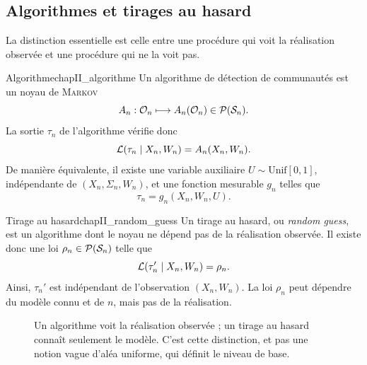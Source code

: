 \subsection{Algorithmes et tirages au hasard}

La distinction essentielle est celle entre une procédure qui voit la réalisation observée et une procédure qui ne la voit pas.

\begin{Definition}{Algorithme}{chapII_algorithme}
Un algorithme de détection de communautés est un noyau de \textsc{Markov}
\[
    A_n:\mathcal O_n\longmapsto A_n(\mathcal O_n)\in\mathcal P(\mathcal S_n).
\]
La sortie $\tau_n$ de l'algorithme vérifie donc
\[
    \mathcal L(\tau_n\mid X_n,W_n)=A_n(X_n,W_n).
\]
De manière équivalente, il existe une variable auxiliaire $U\sim\mathrm{Unif}[0,1]$, indépendante de $(X_n,\Sigma_n,W_n)$, et une fonction mesurable $g_n$ telles que
\[
    \tau_n=g_n(X_n,W_n,U).
\]
\end{Definition}

\begin{Definition}{Tirage au hasard}{chapII_random_guess}
Un tirage au hasard, ou \emph{random guess}, est un algorithme dont le noyau ne dépend pas de la réalisation observée. Il existe donc une loi $\rho_n\in\mathcal P(\mathcal S_n)$ telle que
\[
    \mathcal L(\tau_n'\mid X_n,W_n)=\rho_n.
\]
Ainsi, $\tau_n'$ est indépendant de l'observation $(X_n,W_n)$. La loi $\rho_n$ peut dépendre du modèle connu et de $n$, mais pas de la réalisation.
\end{Definition}

\begin{figure}[H]
\centering
{}
\caption{Un algorithme voit la réalisation observée ; un tirage au hasard connaît seulement le modèle. C'est cette distinction, et pas une notion vague d'aléa uniforme, qui définit le niveau de base.}
\label{fig:chapII_algo_vs_guess}
\end{figure}

